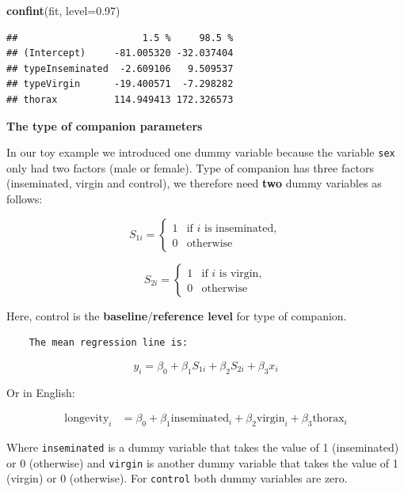 \documentclass[]{book}
\newenvironment{Shaded}{\begin{snugshade}}{\end{snugshade}}
\newcommand{\KeywordTok}[1]{\textcolor[rgb]{0.13,0.29,0.53}{\textbf{#1}}}
\newcommand{\DataTypeTok}[1]{\textcolor[rgb]{0.13,0.29,0.53}{#1}}
\newcommand{\FloatTok}[1]{\textcolor[rgb]{0.00,0.00,0.81}{#1}}
\newcommand{\NormalTok}[1]{#1}
\theoremstyle{definition}
\theoremstyle{definition}
\theoremstyle{definition}
\theoremstyle{remark}
\begin{document}
\begin{Shaded}
\begin{Highlighting}[]
\KeywordTok{confint}\NormalTok{(fit, }\DataTypeTok{level=}\FloatTok{0.97}\NormalTok{)}
\end{Highlighting}
\end{Shaded}

\begin{verbatim}
##                      1.5 %     98.5 %
## (Intercept)     -81.005320 -32.037404
## typeInseminated  -2.609106   9.509537
## typeVirgin      -19.400571  -7.298282
## thorax          114.949413 172.326573
\end{verbatim}

\textbf{The type of companion parameters}

In our toy example we introduced one dummy variable because the variable
\texttt{sex} only had two factors (male or female). Type of companion
has three factors (inseminated, virgin and control), we therefore need
\textbf{two} dummy variables as follows:

\[
S_{1i} = \left\{\begin{array}{ll}
        1 & \mbox{if $i$ is inseminated},\\
        0 & \mbox{otherwise}
        \end{array}
        \right.
\]

\[
S_{2i} = \left\{\begin{array}{ll}
        1 & \mbox{if $i$ is virgin},\\
        0 & \mbox{otherwise}
        \end{array}
        \right.
\]

Here, control is the \textbf{baseline}/\textbf{reference level} for type
of companion.

\begin{verbatim}
    The mean regression line is:
\end{verbatim}

\[
y_i = \beta_0 + \beta_1 S_{1i} + \beta_2 S_{2i} + \beta_3 x_i
\]

Or in English:

\[
\begin{aligned}
\mathrm{longevity}_i & = \beta_0 + \beta_1\mathrm{inseminated}_i + \beta_2\mathrm{virgin}_i + \beta_3\mathrm{thorax}_i
\end{aligned}
\]

Where \texttt{inseminated} is a dummy variable that takes the value of 1
(inseminated) or 0 (otherwise) and \texttt{virgin} is another dummy
variable that takes the value of 1 (virgin) or 0 (otherwise). For
\texttt{control} both dummy variables are zero.
\end{document}
